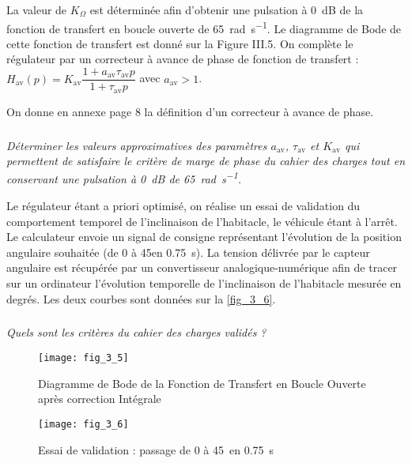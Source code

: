 La valeur de $K_{\Omega}$ est déterminée afin d'obtenir une pulsation à \SI{0}{dB} de la fonction de transfert en boucle ouverte de \SI{65}{rad.s^{-1}}. Le diagramme de Bode de cette fonction de transfert est donné sur la Figure III.5.
On complète le régulateur par un correcteur à avance de phase de fonction de transfert :
$H_{\text{av}}(p)=K_{\text{av}}\dfrac{1+a_{\text{av}}\tau_{\text{av}}p}{1+\tau_{\text{av}}p}$ avec $a_{\text{av}}>1$.

On donne en annexe page 8 la définition d'un correcteur à avance de phase.

\subparagraph{}
\textit{Déterminer les valeurs approximatives des paramètres $a_{\text{av}}$, $\tau_{\text{av}}$ et $K_{\text{av}}$ qui permettent de satisfaire le critère de marge de phase du cahier des charges tout en conservant une pulsation à \SI{0}{dB} de \SI{65}{rad.s^{-1}}.}
\ifprof
\begin{corrige}
\end{corrige}
\else
\fi



Le régulateur étant a priori optimisé, on réalise un essai de validation du comportement temporel de l'inclinaison de l'habitacle, le véhicule étant à l'arrêt. Le calculateur envoie un signal de consigne représentant l'évolution de la position angulaire souhaitée (de 0 à 45\degres en \SI{0,75}{s}). La tension délivrée par le capteur angulaire est récupérée par un convertisseur analogique-numérique afin de tracer sur un ordinateur l'évolution temporelle de l'inclinaison de l'habitacle mesurée en degrés. Les deux courbes sont données sur la \autoref{fig_3_6}.


\subparagraph{}
\textit{Quels sont les critères du cahier des charges validés ?}



\begin{figure}[H]
\centering
\texttt{[image: fig\_3\_5]}
\caption{Diagramme de Bode de la Fonction de Transfert en Boucle Ouverte après correction Intégrale}
\label{fig_3_5}
\end{figure}



\begin{figure}[H]
\centering
\texttt{[image: fig\_3\_6]}
\caption{ Essai de validation : passage de 0 à 45\degres \, en  \SI{0,75}{s}}
\label{fig_3_6}
\end{figure}

